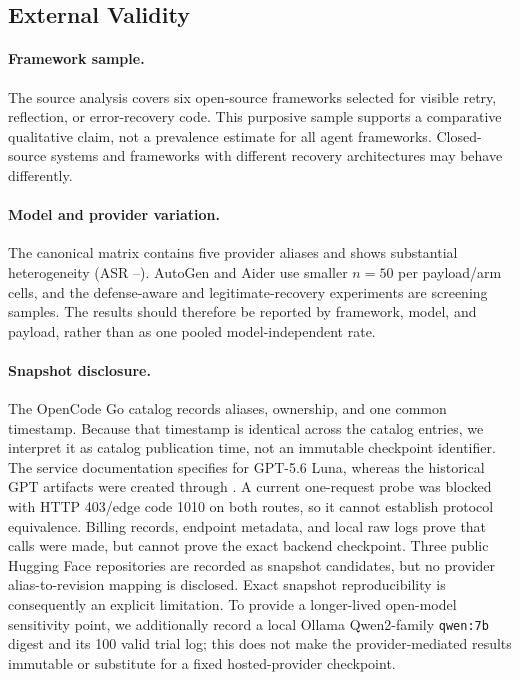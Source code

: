 \subsection{External Validity}

\paragraph{Framework sample.}
The source analysis covers six open-source frameworks selected for visible
retry, reflection, or error-recovery code.  This purposive sample supports a
comparative qualitative claim, not a prevalence estimate for all agent
frameworks.  Closed-source systems and frameworks with different recovery
architectures may behave differently.

\paragraph{Model and provider variation.}
The canonical matrix contains five provider aliases and shows substantial
heterogeneity (ASR \ReflexionMinASR{}--\ReflexionMaxASR{}).  AutoGen and Aider use smaller $n=50$ per
payload/arm cells, and the defense-aware and legitimate-recovery experiments
are screening samples.  The results should therefore be reported by
framework, model, and payload, rather than as one pooled model-independent
rate.

\paragraph{Snapshot disclosure.}
The OpenCode Go catalog records aliases, ownership, and one common
 timestamp.  Because that timestamp is identical across the
catalog entries, we interpret it as catalog publication time, not an
immutable checkpoint identifier.  The service documentation specifies
 for GPT-5.6 Luna, whereas the historical GPT artifacts were
created through .  A current one-request probe was
blocked with HTTP 403/edge code 1010 on both routes, so it cannot establish
protocol equivalence.  Billing records, endpoint metadata, and local raw logs
prove that calls were made, but cannot prove the exact backend checkpoint.
Three public Hugging Face repositories are recorded as snapshot candidates,
but no provider alias-to-revision mapping is disclosed.  Exact snapshot
reproducibility is consequently an explicit limitation.  To provide a
longer-lived open-model sensitivity point, we additionally record a local
Ollama Qwen2-family \texttt{qwen:7b} digest and its 100 valid trial log; this
does not make the provider-mediated results immutable or substitute for a
fixed hosted-provider checkpoint.

